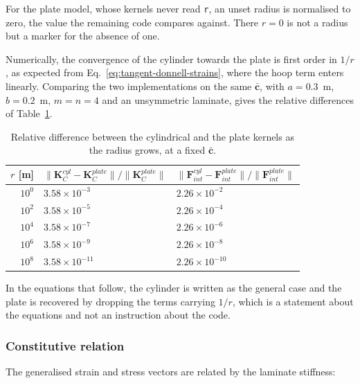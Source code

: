 For the plate model, whose kernels never read \texttt{r}, an unset radius is normalised to zero, the value the remaining code compares against. There $r = 0$ is not a radius but a marker for the absence of one.

Numerically, the convergence of the cylinder towards the plate is first order in $1/r$, as expected from Eq.~\ref{eq:tangent-donnell-strains}, where the hoop term enters linearly. Comparing the two implementations on the same $\bar{\boldsymbol{c}}$, with $a = 0.3$~m, $b = 0.2$~m, $m = n = 4$ and an unsymmetric laminate, gives the relative differences of Table~\ref{tab:tangent-donnell-limit}.

\begin{table}[!htbp]
	\centering
	\caption[]{Relative difference between the cylindrical and the plate kernels as the radius grows, at a fixed $\bar{\boldsymbol{c}}$.}
	\label{tab:tangent-donnell-limit}
	\renewcommand{\arraystretch}{1.3}
	\begin{tabular}{rll}
		\toprule
		$r$ [m] & $\|\boldsymbol{K}_C^{cyl} - \boldsymbol{K}_C^{plate}\| / \|\boldsymbol{K}_C^{plate}\|$ & $\|\boldsymbol{F}_{int}^{cyl} - \boldsymbol{F}_{int}^{plate}\| / \|\boldsymbol{F}_{int}^{plate}\|$ \\
		\midrule
		$10^{0}$ & $3.58 \times 10^{-3}$ & $2.26 \times 10^{-2}$ \\
		$10^{2}$ & $3.58 \times 10^{-5}$ & $2.26 \times 10^{-4}$ \\
		$10^{4}$ & $3.58 \times 10^{-7}$ & $2.26 \times 10^{-6}$ \\
		$10^{6}$ & $3.58 \times 10^{-9}$ & $2.26 \times 10^{-8}$ \\
		$10^{8}$ & $3.58 \times 10^{-11}$ & $2.26 \times 10^{-10}$ \\
		\bottomrule
	\end{tabular}
\end{table}

In the equations that follow, the cylinder is written as the general case and the plate is recovered by dropping the terms carrying $1/r$, which is a statement about the equations and not an instruction about the code.

\subsubsection{Constitutive relation}

The generalised strain and stress vectors are related by the laminate stiffness:

